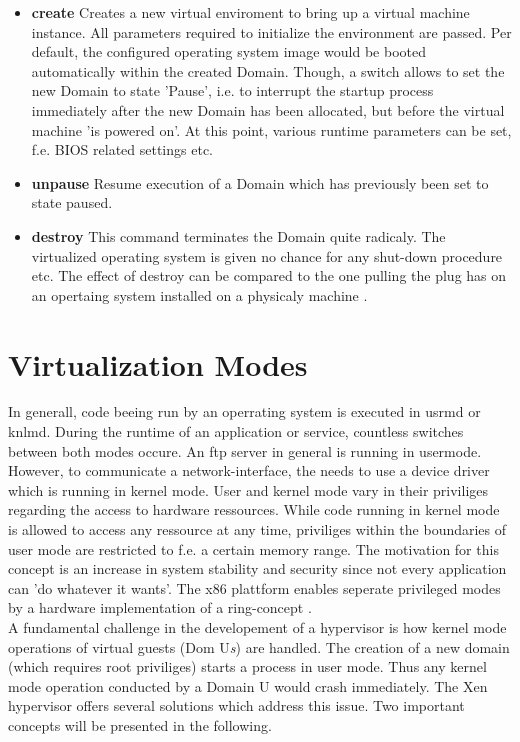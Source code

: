 \begin{itemize}
	\item \textbf{create} Creates a new virtual enviroment to bring up a virtual machine instance. All parameters required to initialize the environment are passed. Per default, the configured operating system image would be booted automatically within the created Domain. Though, a switch allows to set the new Domain to state 'Pause', i.e. to interrupt the startup process immediately after the new Domain has been allocated, but before the virtual machine 'is powered on'. At this point, various runtime parameters can be set, f.e. BIOS related settings etc.
	\item \textbf{unpause} Resume execution of a Domain which has previously been set to state paused.
	\item \textbf{destroy} This command terminates the Domain quite radicaly. The virtualized operating system is given no chance for any shut-down procedure etc. The effect of destroy can be compared to the one pulling the plug has on an opertaing system installed on a physicaly machine \cite{xenxl}.
\end{itemize}

\section{Virtualization Modes}\label{sec:virt-modes}
In generall, code beeing run by an operrating system is executed in \gls{usrmd} or \gls{knlmd}. During the runtime of an application or service, countless switches between both modes occure. An ftp server in general is running in usermode. However, to communicate a network-interface, the needs to use a device driver which is running in kernel mode. User and kernel mode vary in their priviliges regarding the access to hardware ressources. While code running in kernel mode is allowed to access any ressource at any time, priviliges within the boundaries of user mode are restricted to f.e. a certain memory range. The motivation for this concept is an increase in system stability and security since not every application can 'do whatever it wants'. The x86 plattform enables seperate privileged modes by a hardware implementation of a ring-concept \cite{guide2017intel}.\\
A fundamental challenge in the developement of a hypervisor is how kernel mode operations of virtual guests (Dom U{\small \textit{s}}) are handled. The creation of a new domain (which requires \gls{root} priviliges) starts a process in user mode. Thus any kernel mode operation conducted by a Domain U would crash immediately. The Xen hypervisor offers several solutions which address this issue. Two important concepts will be presented in the following.  

